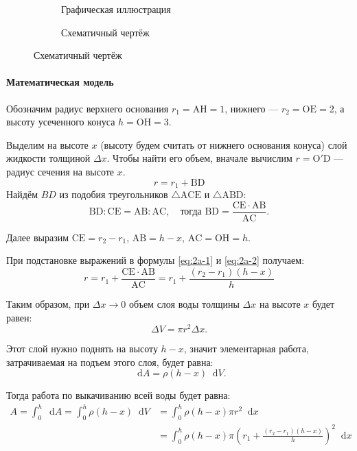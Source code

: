 \documentclass[a4paper,12pt]{article}
\newcommand*\diff{\mathop{}\!\mathrm{d}}
\begin{document}
\begin{figure}[htbp]
  \centering
  \begin{subfigure}[b]{0.47\textwidth}
    \centering
    \caption{Графическая иллюстрация}
  \end{subfigure}
  \hfill
  \begin{subfigure}[b]{0.47\textwidth}
    \centering
    \caption{Схематичный чертёж}
  \end{subfigure}
\end{figure}

\paragraph{Математическая модель}

Обозначим радиус верхнего основания \(r_1 = \mathrm{AH} = 1\),
нижнего --- \(r_2 = \mathrm{OE} = 2\),
а высоту усеченного конуса \(h = \mathrm{OH} = 3\).

Выделим на высоте \(x\) (высоту будем считать от нижнего основания конуса)
слой жидкости толщиной \(\Delta x\).
Чтобы найти его объем,
вначале вычислим \(r = \mathrm{O'D}\) --- радиус сечения на высоте \(x\).
\begin{equation}\label{eq:2a-1}
  r = r_1 + \mathrm{BD}
\end{equation}
Найдём \(BD\) из подобия треугольников
\(\triangle \mathrm{ACE}\) и \(\triangle \mathrm{ABD}\):
\begin{equation}\label{eq:2a-2}
  \mathrm{BD} : \mathrm{CE} = \mathrm{AB} : \mathrm{AC},
  \quad\text{тогда }
  \mathrm{BD} = \frac{\mathrm{CE} \cdot \mathrm{AB}}{\mathrm{AC}}.
\end{equation}

Далее выразим
\(\mathrm{CE} = r_2 - r_1\),
\(\mathrm{AB} = h - x\),
\(\mathrm{AC} = \mathrm{OH} = h\).

При подстановке выражений в формулы \ref{eq:2a-1} и \ref{eq:2a-2} получаем:
\[
  r = r_1 + \frac{\mathrm{CE} \cdot \mathrm{AB}}{\mathrm{AC}}
    = r_1 + \frac{(r_2 - r_1)(h - x)}{h}
\]

Таким образом, при \(\Delta x \to 0\) объем слоя воды толщины \(\Delta x\)
на высоте \(x\) будет равен:
\[\Delta V = \pi r^2 \Delta x.\]

Этот слой нужно поднять на высоту \(h - x\),
значит элементарная работа, затрачиваемая на подъем этого слоя,
будет равна:
\[\diff A = \rho (h - x) \diff V.\]

Тогда работа по выкачиванию всей воды будет равна:
\begin{equation}\label{eq:2a-int}
\begin{split}
  A = \int_{0}^{h} \diff A
    = \int_{0}^{h} \rho (h - x) \diff V
    &= \int_{0}^{h} \rho (h - x) \pi r^2 \diff x \\
    &= \int_{0}^{h} \rho (h - x) \pi
       {\left(r_1 + \frac{(r_2 - r_1)(h - x)}{h}\right)}^2 \diff x
\end{split}
\end{equation}
\end{document}
